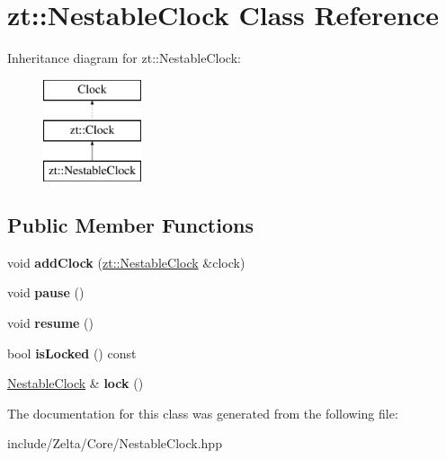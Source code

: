 \hypertarget{classzt_1_1_nestable_clock}{}\section{zt\+:\+:Nestable\+Clock Class Reference}
\label{classzt_1_1_nestable_clock}
Inheritance diagram for zt\+:\+:Nestable\+Clock\+:\begin{figure}[H]
\begin{center}
\leavevmode
\includegraphics[height=3.000000cm]{classzt_1_1_nestable_clock}
\end{center}
\end{figure}
\subsection*{Public Member Functions}
\begin{DoxyCompactItemize}
\item 
\mbox{\label{classzt_1_1_nestable_clock_afc262bba7ae3fedec80f58d8daf74575}} 
void {\bfseries add\+Clock} (\hyperlink{classzt_1_1_nestable_clock}{zt\+::\+Nestable\+Clock} \&clock)
\item 
\mbox{\label{classzt_1_1_nestable_clock_a429fd96903819349981f10523b1a45b6}} 
void {\bfseries pause} ()
\item 
\mbox{\label{classzt_1_1_nestable_clock_ae157673580027b82b54964f1380f5b9d}} 
void {\bfseries resume} ()
\item 
\mbox{\label{classzt_1_1_nestable_clock_a0c7d3b6e91465e14cbeab841b888d55b}} 
bool {\bfseries is\+Locked} () const
\item 
\mbox{\label{classzt_1_1_nestable_clock_a00ef4ad0179e820e8e0d960acec19e2f}} 
\hyperlink{classzt_1_1_nestable_clock}{Nestable\+Clock} \& {\bfseries lock} ()
\end{DoxyCompactItemize}


The documentation for this class was generated from the following file\+:\begin{DoxyCompactItemize}
\item 
include/\+Zelta/\+Core/Nestable\+Clock.\+hpp\end{DoxyCompactItemize}
